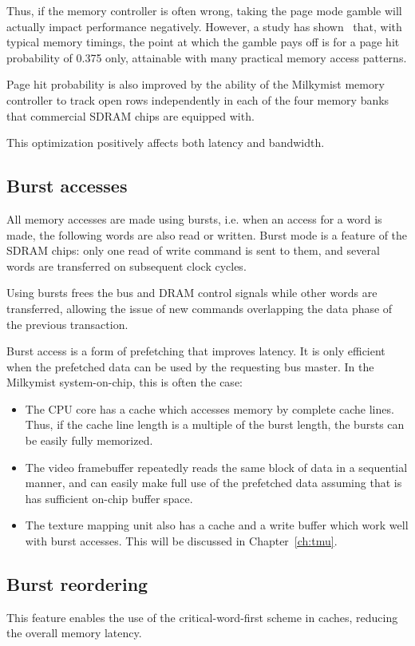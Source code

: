 \documentclass[a4paper,11pt]{kthesis}
\begin{document}
Thus, if the memory controller is often wrong, taking the page mode gamble will actually impact performance negatively. However, a study has shown~\cite{pagemode} that, with typical memory timings, the point at which the gamble pays off is for a page hit probability of 0.375 only, attainable with many practical memory access patterns.

Page hit probability is also improved by the ability of the Milkymist memory controller to track open rows independently in each of the four memory banks that commercial SDRAM chips are equipped with.

This optimization positively affects both latency and bandwidth.

\subsection{Burst accesses}
All memory accesses are made using bursts, i.e. when an access for a word is made, the following words are also read or written. Burst mode is a feature of the SDRAM chips: only one read of write command is sent to them, and several words are transferred on subsequent clock cycles.

Using bursts frees the bus and DRAM control signals while other words are transferred, allowing the issue of new commands overlapping the data phase of the previous transaction.

Burst access is a form of prefetching that improves latency. It is only efficient when the prefetched data can be used by the requesting bus master. In the Milkymist system-on-chip, this is often the case:
\begin{itemize}
\item The CPU core has a cache which accesses memory by complete cache lines. Thus, if the cache line length is a multiple of the burst length, the bursts can be easily fully memorized.
\item The video framebuffer repeatedly reads the same block of data in a sequential manner, and can easily make full use of the prefetched data assuming that is has sufficient on-chip buffer space.
\item The texture mapping unit also has a cache and a write buffer which work well with burst accesses. This will be discussed in Chapter~\ref{ch:tmu}.
\end{itemize}

\subsection{Burst reordering}
This feature enables the use of the critical-word-first scheme in caches, reducing the overall memory latency.
\end{document}
